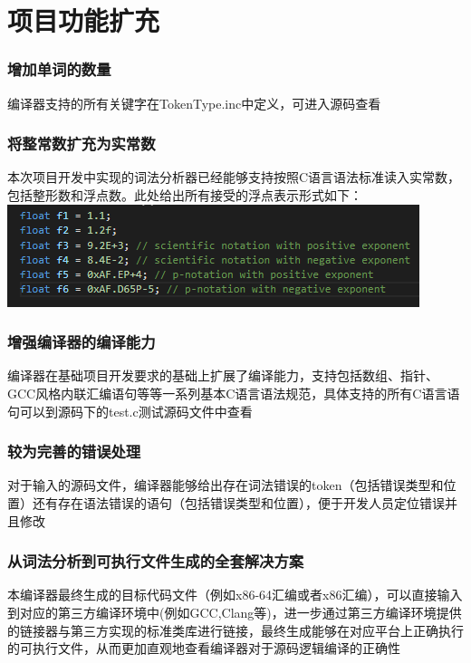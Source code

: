\section{项目功能扩充}
\begin{frame}
    \frametitle{增加单词的数量}
    \footnotesize
    {编译器支持的所有关键字在TokenType.inc中定义，可进入源码查看}
\end{frame}

\begin{frame}
    \frametitle{将整常数扩充为实常数}
    \footnotesize
    {本次项目开发中实现的词法分析器已经能够支持按照C语言语法标准读入实常数，包括整形数和浮点数。此处给出所有接受的浮点表示形式如下：}
    \includegraphics[width=\textwidth]{contents/figure/float.png}
\end{frame}

\begin{frame}
    \frametitle{增强编译器的编译能力}
    \footnotesize
    {编译器在基础项目开发要求的基础上扩展了编译能力，支持包括数组、指针、GCC风格内联汇编语句等等一系列基本C语言语法规范，具体支持的所有C语言语句可以到源码下的test.c测试源码文件中查看}
\end{frame}

\begin{frame}
    \frametitle{较为完善的错误处理}
    \footnotesize
    {对于输入的源码文件，编译器能够给出存在词法错误的token（包括错误类型和位置）还有存在语法错误的语句（包括错误类型和位置），便于开发人员定位错误并且修改}
\end{frame}

\begin{frame}
    \frametitle{从词法分析到可执行文件生成的全套解决方案}
    \footnotesize
    {本编译器最终生成的目标代码文件（例如x86-64汇编或者x86汇编），可以直接输入到对应的第三方编译环境中(例如GCC,Clang等)，进一步通过第三方编译环境提供的链接器与第三方实现的标准类库进行链接，最终生成能够在对应平台上正确执行的可执行文件，从而更加直观地查看编译器对于源码逻辑编译的正确性}
\end{frame}